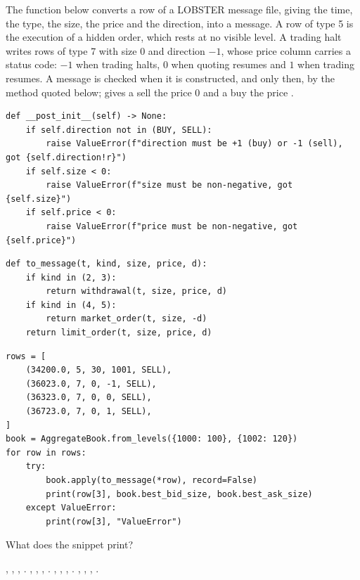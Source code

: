 \begin{question}
\label{question.lobsterHaltRowsReplayed}
The function  below converts a row of a LOBSTER message file,
giving the time, the type, the size, the price and the direction, into a message.
A row of type 5 is the execution of a hidden order, which rests at no visible level.
A trading halt writes rows of type 7 with size 0 and direction $-1$,
whose price column carries a status code:
$-1$ when trading halts, $0$ when quoting resumes and $1$ when trading resumes.
A message is checked when it is constructed, and only then, by the method quoted below;
 gives a sell the price 0 and a buy the price .
\begin{lstlisting}[caption={\protect\codehl{unito26.lob.messages.Message.\_\_post\_init\_\_}}, label=listing.lobsterHaltRowsReplayedValidation]
def __post_init__(self) -> None:
    if self.direction not in (BUY, SELL):
        raise ValueError(f"direction must be +1 (buy) or -1 (sell), got {self.direction!r}")
    if self.size < 0:
        raise ValueError(f"size must be non-negative, got {self.size}")
    if self.price < 0:
        raise ValueError(f"price must be non-negative, got {self.price}")
\end{lstlisting}
\begin{lstlisting}[caption={A conversion of rows to messages}, label=listing.lobsterHaltRowsReplayedConversion]
def to_message(t, kind, size, price, d):
    if kind in (2, 3):
        return withdrawal(t, size, price, d)
    if kind in (4, 5):
        return market_order(t, size, -d)
    return limit_order(t, size, price, d)
\end{lstlisting}
\begin{lstlisting}[caption={A hidden execution and a halt, replayed}, label=listing.lobsterHaltRowsReplayedRun]
rows = [
    (34200.0, 5, 30, 1001, SELL),
    (36023.0, 7, 0, -1, SELL),
    (36323.0, 7, 0, 0, SELL),
    (36723.0, 7, 0, 1, SELL),
]
book = AggregateBook.from_levels({1000: 100}, {1002: 120})
for row in rows:
    try:
        book.apply(to_message(*row), record=False)
        print(row[3], book.best_bid_size, book.best_ask_size)
    except ValueError:
        print(row[3], "ValueError")
\end{lstlisting}
What does the snippet print?
\begin{choices}
 \choice {}, , , .
 \choice {}, , , .
 \choice {}, , , .
 \correctchoice {}, , , .
\end{choices}
\end{question}

